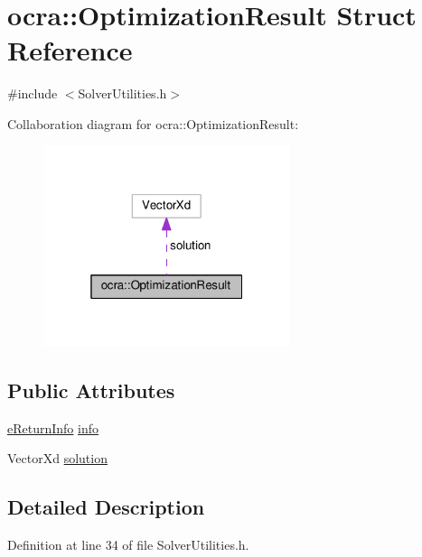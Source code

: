 \hypertarget{structocra_1_1OptimizationResult}{}\section{ocra\+:\+:Optimization\+Result Struct Reference}
\label{structocra_1_1OptimizationResult}


{\ttfamily \#include $<$Solver\+Utilities.\+h$>$}



Collaboration diagram for ocra\+:\+:Optimization\+Result\+:
\nopagebreak
\begin{figure}[H]
\begin{center}
\leavevmode
\includegraphics[width=205pt]{d4/d27/structocra_1_1OptimizationResult__coll__graph}
\end{center}
\end{figure}
\subsection*{Public Attributes}
\begin{DoxyCompactItemize}
\item 
\hyperlink{namespaceocra_aa1d873ac30cb0a0f79ba978745de294b}{e\+Return\+Info} \hyperlink{structocra_1_1OptimizationResult_ab422e9cee7b8996585676d61ca14499b}{info}
\item 
Vector\+Xd \hyperlink{structocra_1_1OptimizationResult_a5d0f76e8b3e5d517ba83a2ecd082f85b}{solution}
\end{DoxyCompactItemize}


\subsection{Detailed Description}


Definition at line 34 of file Solver\+Utilities.\+h.



